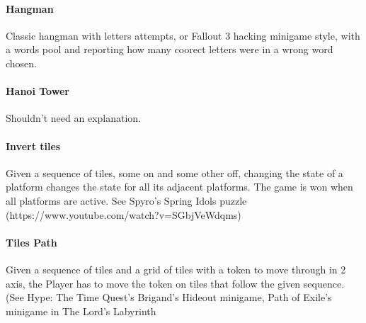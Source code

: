\paragraph{Hangman} Classic hangman with letters attempts, or Fallout 3 hacking minigame style, with a words pool and reporting how many coorect letters were in a wrong word chosen.

\paragraph{Hanoi Tower} Shouldn't need an explanation.

\paragraph{Invert tiles} Given a sequence of tiles, some on and some other off, changing the state of a platform changes the state for all its adjacent platforms. The game is won when all platforms are active. See Spyro's Spring Idols puzzle (https://www.youtube.com/watch?v=SGbjVeWdqms)


\paragraph{Tiles Path} Given a sequence of tiles and a grid of tiles with a token to move through in 2 axis, the Player has to move the token on tiles that follow the given sequence. (See Hype: The Time Quest's Brigand's Hideout minigame, Path of Exile's minigame in The Lord's Labyrinth


\pagebreak